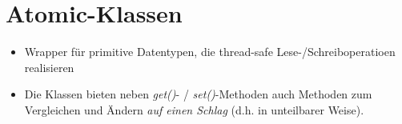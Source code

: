 \section{Atomic-Klassen}



\begin{itemize}
    \item Wrapper für primitive Datentypen, die thread-safe Lese-/Schreiboperatioen realisieren
    \item Die Klassen bieten neben \textit{get()}- / \textit{set()}-Methoden auch Methoden zum Vergleichen und Ändern \textit{auf einen Schlag} (d.h. in unteilbarer Weise).
\end{itemize}
